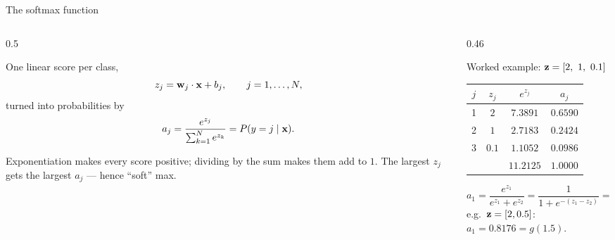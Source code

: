 \documentclass[aspectratio=169,10pt]{beamer}
\begin{document}
\begin{frame}{The softmax function}
  \begin{columns}[T,onlytextwidth]
    \begin{column}{0.5\textwidth}
      \begin{defnbox}
        \small
        One linear score per class,
        \[ z_j=\mathbf{w}_j\cdot\mathbf{x}+b_j,\qquad j=1,\dots,N, \]
        turned into probabilities by
        \[ a_j=\frac{e^{z_j}}{\sum_{k=1}^{N}e^{z_k}}=P(y=j\mid\mathbf{x}). \]
      \end{defnbox}
      \footnotesize
      Exponentiation makes every score positive; dividing by the sum makes them add to $1$.
      The largest $z_j$ gets the largest $a_j$ --- hence ``soft'' max.
    \end{column}
    \begin{column}{0.46\textwidth}
      \footnotesize
      \begin{block}{Worked example: $\vz=[2,\ 1,\ 0.1]$}
        \renewcommand{\arraystretch}{1.15}
        \begin{tabular}{@{}cccc@{}}
          \toprule
          $j$ & $z_j$ & $e^{z_j}$ & $a_j$\\
          \midrule
          1 & $2$   & $7.3891$ & $0.6590$\\
          2 & $1$   & $2.7183$ & $0.2424$\\
          3 & $0.1$ & $1.1052$ & $0.0986$\\
          \midrule
            &       & $11.2125$ & $1.0000$\\
          \bottomrule
        \end{tabular}
      \end{block}
      \begin{keyidea}[$N=2$ gives back logistic regression]
        \[ a_1=\frac{e^{z_1}}{e^{z_1}+e^{z_2}}=\frac{1}{1+e^{-(z_1-z_2)}}=g(z_1-z_2) \]
        e.g.\ $\mathbf{z}=[2,0.5]$: $a_1=0.8176=g(1.5)$.
      \end{keyidea}
    \end{column}
  \end{columns}
\end{frame}
\end{document}
